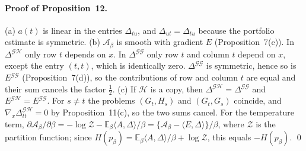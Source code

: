 \paragraph{Proof of Proposition~12.}
(a) $a(t)$ is linear in the entries $\Delta_{tu}$, and $\Delta_{ut}=\Delta_{tu}$ because the portfolio estimate is symmetric. (b) $\mathcal A_\beta$ is smooth with gradient $E$ (Proposition~7(c)). In $\Delta^{\mathcal{GH}}$ only row $t$ depends on $x$. In $\Delta^{\mathcal{GG}}$ only row $t$ and column $t$ depend on $x$, except the entry $(t,t)$, which is identically zero. $\Delta^{\mathcal{GG}}$ is symmetric, hence so is $E^{\mathcal{GG}}$ (Proposition~7(d)), so the contributions of row and column $t$ are equal and their sum cancels the factor $\frac12$. (c) If $\mathcal H$ is a copy, then $\Delta^{\mathcal{GH}}=\Delta^{\mathcal{GG}}$ and $E^{\mathcal{GH}}=E^{\mathcal{GG}}$. For $s\neq t$ the problems $(G_t,H_s)$ and $(G_t,G_s)$ coincide, and $\nabla_x\Delta^{\mathcal{GH}}_{tt}=0$ by Proposition~11(c), so the two sums cancel. For the temperature term, $\partial\mathcal A_\beta/\partial\beta=-\log\mathcal Z-\mathbb E_\beta\langle A,\Delta\rangle/\beta=\{\mathcal A_\beta-\langle E,\Delta\rangle\}/\beta$, where $\mathcal Z$ is the partition function; since $H(p_\beta)=\mathbb E_\beta\langle A,\Delta\rangle/\beta+\log\mathcal Z$, this equals $-H(p_\beta)$. \qed

